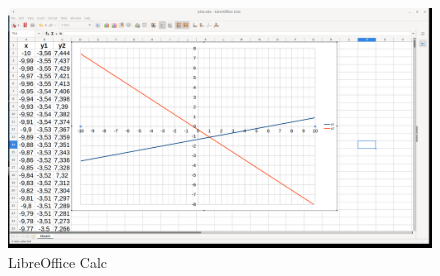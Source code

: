 \begin{figure}[h!]		
	\centering
   	\includegraphics[width=8.0in]{pictures/picture_026.png}
  	\caption{LibreOffice Calc}
   	\label{fig:LibreOfficeCalc026}
\end{figure}